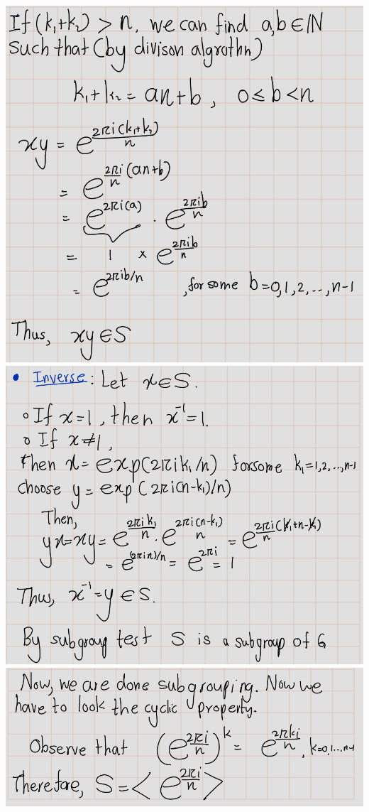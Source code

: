 \documentclass[
]{book}
\begin{document}
\includegraphics{figures/ch_2/fig25.png}
\includegraphics{figures/ch_2/fig26.png}
\includegraphics{figures/ch_2/fig27.png}
\end{document}
